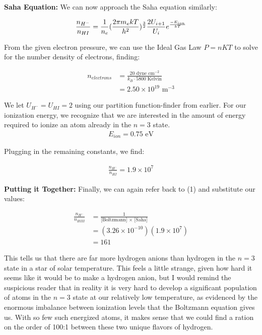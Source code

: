 \documentclass[12pt]{article}
\newenvironment{answer}[2][Answer]{\begin{trivlist}
\item[\hskip \labelsep {\bfseries #1}\hskip \labelsep {\bfseries #2.}]}{\end{trivlist}}
\begin{document}
\begin{answer}{4}
\bigskip



\textbf{Saha Equation: } We can now approach the Saha equation similarly:

\begin{align*}
  \frac{n_{H^-}}{n_{HI}} = \frac{1}{n_e} (\frac{2 \pi m_e kT}{h^2})^{3 \over 2} \frac{2 U_{i+1}}{U_i} e^{\frac{-E_{ion}}{kT}}
\end{align*}


From the given electron pressure, we can use the Ideal Gas Law $P = nKT$ to solve for the number density of electrons, finding:

\begin{align*}
  n_{electrons} &= \frac{20 \text{ dyne cm$^{-2}$}}{k_B \cdot 5800 \text{ Kelvin}} \\
                &= 2.50 \times 10^{19} \text{ m$^{-3}$}
\end{align*}

We let $U_{H^-} = U_{HI} = 2$ using our partition function-finder from earlier. For our ionization energy, we recognize that we are interested in the amount of energy required to ionize an atom already in the $n=3$ state.
\begin{align}
  E_{ion} = 0.75 \text{ eV}
\end{align}

Plugging in the remaining constants, we find:

\begin{align}
  \frac{n_{H^-}}{n_{HI}} = 1.9 \times 10^{7}
\end{align}


\textbf{Putting it Together: } Finally, we can again refer back to (1) and substitute our values:


\begin{align}
  \frac{n_{H^-}}{n_{HIII}} &= \frac{1}{\text{[Boltzmann] $\times$ [Saha]}} \\
                           &= (3.26 \times 10^{-10}) (1.9 \times 10^{7}) \\
                           &= 161
\end{align}



This tells us that there are far more hydrogen anions than hydrogen in the $n = 3$ state in a star of solar temperature. This feels a little strange, given how hard it seems like it would be to make a hydrogen anion, but I would remind the suspicious reader that in reality it is very hard to develop a significant population of atoms in the $n=3$ state at our relatively low temperature, as evidenced by the enormous imbalance between ionization levels that the Boltzmann equation gives us. With so few such energized atoms, it makes sense that we could find a ration on the order of 100:1 between these two unique flavors of hydrogen.
















\end{answer}
\end{document}
